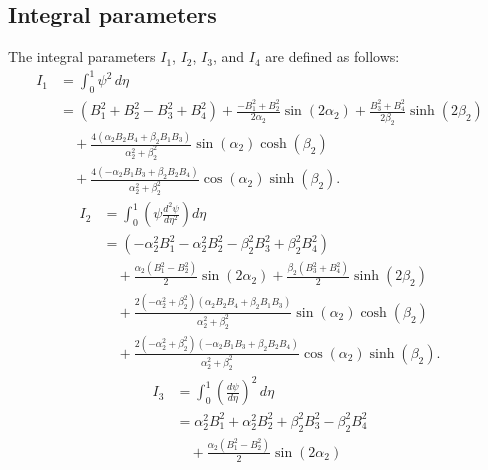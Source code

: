 \documentclass[preprint,12pt,number]{elsarticle}
\begin{document}
\FloatBarrier
\begin{appendices}
\renewcommand{\theequation}{\thesection.\arabic{equation}}
\section{Integral parameters}\label{sec:appendA}
The integral parameters $ I_1$, $I_2$, $I_3$, and $ I_4$ are defined as follows:
%
\begin{equation}\label{eq:inte_phi}
	\begin{aligned}
		I_1 &= \int_{0}^{1} \psi^2 \, d\eta \\
		&= (B_1^2 + B_2^2 - B_3^2 + B_4^2) 
		+ \frac{-B_1^2 + B_2^2}{2\alpha_2} \sin(2\alpha_2) 
		+ \frac{B_3^2 + B_4^2}{2\beta_2} \sinh(2\beta_2) \\
		&\quad + \frac{4(\alpha_2 B_2B_4 + \beta_2 B_1B_3)}{\alpha_2^2 + \beta_2^2} \sin(\alpha_2) \cosh(\beta_2) \\
		&\quad + \frac{4(-\alpha_2 B_1B_3 + \beta_2 B_2B_4)}{\alpha_2^2 + \beta_2^2} \cos(\alpha_2) \sinh(\beta_2).
	\end{aligned}
\end{equation}
%
\begin{equation}\label{eq:inte_dphi2}
	\begin{split}
		I_2 &= \int_{0}^{1} \left( \psi \frac{d^2 \psi}{d \eta^2} \right) d \eta \\
		&= \left( -\alpha_2^2 B_1^2 - \alpha_2^2 B_2^2 - \beta_2^2 B_3^2 + \beta_2^2 B_4^2 \right) \\
		&\quad + \frac{\alpha_2 (B_1^2 - B_2^2)}{2} \sin(2 \alpha_2) 
		+ \frac{\beta_2 (B_3^2 + B_4^2)}{2} \sinh(2 \beta_2) \\
		&\quad + \frac{2(-\alpha_2^2 + \beta_2^2) (\alpha_2 B_2 B_4 + \beta_2 B_1 B_3)}{\alpha_2^2 + \beta_2^2} \sin(\alpha_2) \cosh(\beta_2) \\
		&\quad + \frac{2(-\alpha_2^2 + \beta_2^2) (-\alpha_2 B_1 B_3 + \beta_2 B_2 B_4)}{\alpha_2^2 + \beta_2^2} \cos(\alpha_2) \sinh(\beta_2).
	\end{split}
\end{equation}
%
\begin{equation}\label{eq:inte_dphi3}
	\begin{aligned}
		I_3 &= \int_{0}^{1} \left(\frac{d\psi}{d\eta}\right)^2 \, d\eta \\
		&= \alpha_2^2 B_1^2 + \alpha_2^2 B_2^2 + \beta_2^2 B_3^2 - \beta_2^2 B_4^2 \\
		&\quad + \frac{\alpha_2 (B_1^2 - B_2^2)}{2} \sin(2\alpha_2) 

\end{aligned}
\end{equation}
\end{appendices}
\end{document}
